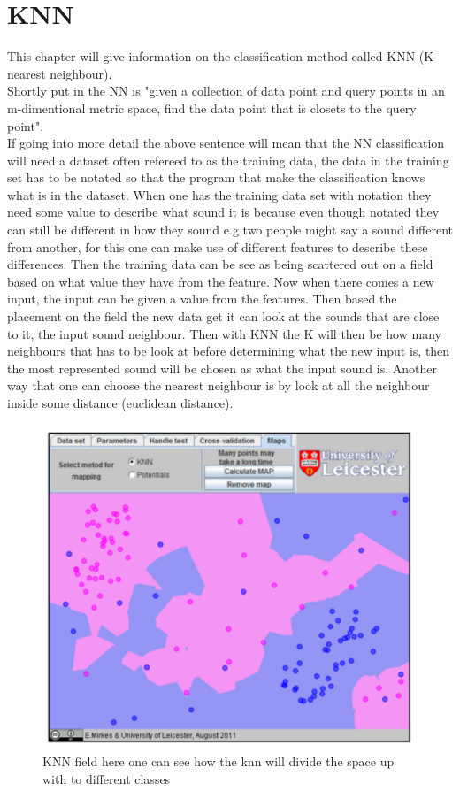 \section{KNN}
This chapter will give information on the classification method called KNN (K nearest neighbour).\\
Shortly put in \citep{meaningfulNN} the NN is "given a collection of data point and query points in an m-dimentional metric space, find the data point that is closets to the query point".\\
If going into more detail the above sentence will mean that the NN classification will need a dataset often refereed to as the training data, the data in the training set has to be notated so that the program that make the classification knows what is in the dataset. When one has the training data set with notation they need some value to describe what sound it is  because even though notated they can still be different in how they sound e.g two people might say a sound different from another, for this one can make use of different features to describe these differences. Then the training data can be see as being scattered out on a field based on what value they have from the feature. Now when there comes a new input, the input can be given a value from the features. Then based the placement on the field the new data get it can look at the sounds that are close to it, the input sound neighbour. Then with KNN the K will then be how many neighbours that has to be look at before determining what the new input is, then the most represented sound will be chosen as what the input sound is. Another way that one can choose the nearest neighbour is by look at all the neighbour inside some distance (euclidean distance)\citep{NNHD}.

\begin{figure}[h]
	\begin{center}
		\includegraphics[scale = 0.5]{fig/KNNfig.jpg}
		\caption{KNN field here one can see how the knn will divide the space up with to different classes \citep{introKNN}}
		\label{KNN fig}
	\end{center}
\end{figure}
